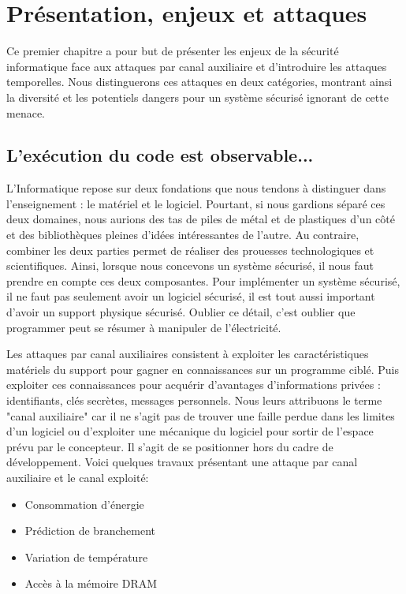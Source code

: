 \chapter{Présentation, enjeux et attaques}
\label{chap:constantTimePresentation}


Ce premier chapitre a pour but de présenter les enjeux de la sécurité informatique face aux attaques par canal auxiliaire et d'introduire les attaques temporelles. Nous distinguerons ces attaques en deux catégories, montrant ainsi la diversité et les potentiels dangers pour un système sécurisé ignorant de cette menace.



\section{L'exécution du code est observable...}

L'Informatique repose sur deux fondations que nous tendons à distinguer dans l'enseignement : le matériel et le logiciel. Pourtant, si nous gardions séparé ces deux domaines, nous aurions des tas de piles de métal et de plastiques d'un côté et des bibliothèques pleines d'idées intéressantes de l'autre. Au contraire, combiner les deux parties permet de réaliser des prouesses technologiques et scientifiques. Ainsi, lorsque nous concevons un système sécurisé, il nous faut prendre en compte ces deux composantes. Pour implémenter un système sécurisé, il ne faut pas seulement avoir un logiciel sécurisé, il est tout aussi important d'avoir un support physique sécurisé. Oublier ce détail, c'est oublier que programmer peut se résumer à manipuler de l'électricité.\medbreak

Les attaques par canal auxiliaires consistent à exploiter les caractéristiques matériels du support pour gagner en connaissances sur un programme ciblé. Puis exploiter ces connaissances pour acquérir d'avantages d'informations privées : identifiants, clés secrètes, messages personnels. Nous leurs attribuons le terme "canal auxiliaire" car il ne s'agit pas de trouver une faille perdue dans les limites d'un logiciel ou d'exploiter une mécanique du logiciel pour sortir de l'espace prévu par le concepteur. Il s'agit de se positionner hors du cadre de développement. Voici quelques travaux présentant une attaque par canal auxiliaire et le canal exploité:
\begin{itemize}
    \item[\cite{DPA_Attack}] Consommation d'énergie 
    \item[\cite{Branch_Attack}] Prédiction de branchement 
    \item[\cite{Thermal_Attack}] Variation de température
    \item[\cite{DRAM_Attack}] Accès à la mémoire DRAM
\end{itemize}\medbreak


